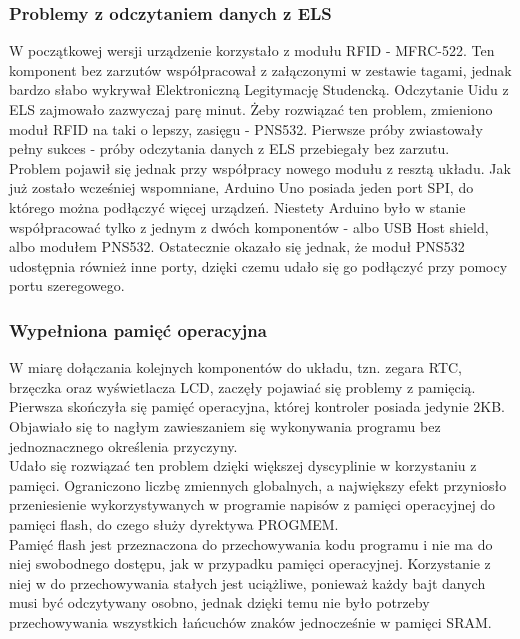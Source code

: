 \documentclass[declaration,shortabstract, mgr]{iithesis}
\begin{document}
\subsubsection{Problemy z odczytaniem danych z ELS}
\indent W początkowej wersji urządzenie korzystało z modułu RFID - MFRC-522. Ten komponent bez zarzutów współpracował z załączonymi w zestawie tagami, jednak bardzo słabo wykrywał Elektroniczną Legitymację Studencką. Odczytanie Uidu z ELS zajmowało zazwyczaj parę minut. Żeby rozwiązać ten problem, zmieniono moduł RFID na taki o lepszy, zasięgu - PNS532. Pierwsze próby zwiastowały pełny sukces - próby odczytania danych z ELS przebiegały bez zarzutu. \\
\indent Problem pojawił się jednak przy współpracy nowego modułu z resztą układu. Jak już zostało wcześniej wspomniane, Arduino Uno posiada jeden port SPI, do którego można podłączyć więcej urządzeń. Niestety Arduino było w stanie współpracować tylko z jednym z dwóch komponentów - albo USB Host shield, albo modułem PNS532. Ostatecznie okazało się jednak, że moduł PNS532 udostępnia również inne porty, dzięki czemu udało się go podłączyć przy pomocy portu szeregowego.
\subsubsection{Wypełniona pamięć operacyjna}
\indent W miarę dołączania kolejnych komponentów do układu, tzn. zegara RTC, brzęczka oraz wyświetlacza LCD, zaczęły pojawiać się problemy z pamięcią. \\
\indent Pierwsza skończyła się pamięć operacyjna, której kontroler posiada jedynie 2KB. Objawiało się to nagłym zawieszaniem się wykonywania programu bez jednoznacznego określenia przyczyny.\\
\indent Udało się rozwiązać ten problem dzięki większej dyscyplinie w korzystaniu z pamięci. Ograniczono liczbę zmiennych globalnych, a największy efekt przyniosło przeniesienie wykorzystywanych w programie napisów z pamięci operacyjnej do pamięci flash, do czego służy dyrektywa PROGMEM.\\
\indent Pamięć flash jest przeznaczona do przechowywania kodu programu i nie ma do niej swobodnego dostępu, jak w przypadku pamięci operacyjnej. Korzystanie z niej w do przechowywania stałych jest uciążliwe, ponieważ każdy bajt danych musi być odczytywany osobno, jednak dzięki temu nie było potrzeby przechowywania wszystkich łańcuchów znaków jednocześnie w pamięci SRAM.
\end{document}
